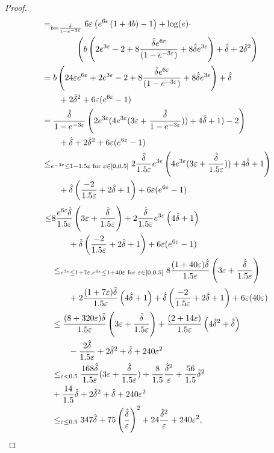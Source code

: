 \begin{proof}
\begin{align*}
& =_{ b = \frac{\hat{\delta}}{1-e^{-3\varepsilon}} } 
6\varepsilon\left(e^{6\epsilon} \left( 1+ 4b \right) - 1 \right) + \log(e) \cdot \\
& \qquad \qquad \left( b \left( 2e^{3\varepsilon} - 2  + 8\frac{\hat{\delta} e^{6 \varepsilon}}{(1-e^{-3\varepsilon})} + 8\hat{\delta} e^{3 \varepsilon}\right) + \hat{\delta} + 2\hat{\delta}^2 \right) \\
& = 
b \left( 24\varepsilon e^{6\varepsilon} + 2e^{3\varepsilon} - 2  + 8\frac{\hat{\delta} e^{6 \varepsilon}}{(1-e^{-3\varepsilon})} + 8\hat{\delta} e^{3 \varepsilon}\right) + \hat{\delta} \\
& \qquad +  2\hat{\delta}^2 + 6\varepsilon(e^{6\varepsilon} - 1) \\
& = \frac{\hat{\delta}}{1-e^{-3\varepsilon}}  \left( 2e^{3 \varepsilon} (4e^{3\varepsilon}(3\varepsilon + \frac{\hat{\delta}}{1-e^{-3\varepsilon}} )) + 4\hat{\delta} + 1) - 2 \right) \\
& \qquad + \hat{\delta} + 2\hat{\delta}^2 + 6\varepsilon(e^{6\varepsilon} - 1) \\
& \leq_{{e^{-3\varepsilon}} \leq 1-1.5\varepsilon \text{ for } \varepsilon \in [0,0.5]}
2 \frac{\hat{\delta}}{1.5\varepsilon} e^{3 \varepsilon} \left (4e^{3\varepsilon}(3\varepsilon + \frac{\hat{\delta}}{1.5\varepsilon})) + 4\hat{\delta} + 1\right) \\
& \qquad + \hat{\delta} \left( \frac{-2}{1.5\varepsilon} + 2\hat{\delta} + 1 \right) + 6\varepsilon(e^{6\varepsilon} - 1) 
\end{align*}
\begin{align*}
\leq & 8\frac{e^{6\varepsilon} \hat{\delta}}{1.5\varepsilon} \left (3\varepsilon + \frac{\hat{\delta}}{1.5\varepsilon} \right) + 2 \frac{\hat{\delta}}{1.5\varepsilon} e^{3 \varepsilon} \left( 4\hat{\delta} + 1\right) \\
& \qquad +  \hat{\delta} \left( \frac{-2}{1.5\varepsilon} + 2\hat{\delta} + 1 \right) + 6\varepsilon(e^{6\varepsilon} - 1) \\ 
& \leq_{{e^{3\varepsilon}} \leq 1+7\varepsilon, {e^{6\varepsilon}} \leq 1+40\varepsilon \text{ for } \varepsilon \in [0,0.5]} 8\frac{(1+40\varepsilon) \hat{\delta}}{1.5\varepsilon} \left (3\varepsilon + \frac{\hat{\delta}}{1.5\varepsilon} \right) \\
& \qquad + 2 \frac{(1+7\varepsilon)\hat{\delta}}{1.5\varepsilon} \left( 4\hat{\delta} + 1\right) + \hat{\delta} \left( \frac{-2}{1.5\varepsilon} + 2\hat{\delta} + 1 \right) + 6\varepsilon(40\varepsilon) \\
& \leq \frac{(8+320\varepsilon) \hat{\delta}}{1.5\varepsilon} \left (3\varepsilon + \frac{\hat{\delta}}{1.5\varepsilon} \right) + \frac{(2+14\varepsilon)}{1.5\varepsilon} \left( 4\hat{\delta}^2 + \hat{\delta}\right) \\
& \qquad - \frac{2\hat{\delta}}{1.5\varepsilon} + 2\hat{\delta}^2 + \hat{\delta} + 240\varepsilon^2 \\
& \leq_{\varepsilon < 0.5}  \frac{168\hat{\delta}}{1.5\varepsilon}(3\varepsilon + \frac{\hat{\delta}}{1.5\varepsilon} ) + \frac{8}{1.5}\frac{\hat{\delta}^2}{\varepsilon} + \frac{56}{1.5}\hat{\delta}^2 \\
& + \frac{14}{1.5}\hat{\delta} + 2\hat{\delta}^2 + \hat{\delta} + 240\varepsilon^2 \\
& \leq_{\varepsilon \leq 0.5} 347\hat{\delta} + 75 \left(\frac{\hat{\delta}}{\varepsilon} \right)^2 + 24\frac{\hat{\delta}^2}{\varepsilon}+ 240\varepsilon^2,
\end{align*}
\fi
\end{proof}

